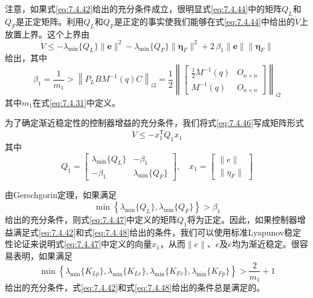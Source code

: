 \documentclass[UTF8]{ctexart}
\begin{document}
注意，如果式\eqref{eq:7.4.42}给出的充分条件成立，很明显式\eqref{eq:7.4.44}中的矩阵$Q_L$和$Q_F$是正定矩阵。利用$Q_L$和$Q_F$是正定的事实使我们能够在式\eqref{eq:7.4.44}中给出的$\dot{V}$上放置上界。这个上界由
\begin{equation}\label{eq:7.4.46}
\dot{V} \leq -\lambda_{\min}\{Q_L\}\|\mathbf{e}\|^2 - \lambda_{\min}\{Q_F\}\|\boldsymbol{\eta}_F\|^2 + 2\, \beta_1 \|\mathbf{e}\| \|\boldsymbol{\eta}_F\|
\end{equation}
给出，其中
\begin{equation*}
\beta_1 = \frac{1}{m_1} > \left\|P_L B M^{-1}(q) C\right\|_{i2} = \frac{1}{2}\left\|\begin{bmatrix} \frac{1}{2}M^{-1}(q) & O_{n \times n} \\ M^{-1}(q) & O_{n \times n} \end{bmatrix}\right\|_{i2}
\end{equation*}
其中$m_1$在式\eqref{eq:7.4.31}中定义。

为了确定渐近稳定性的控制器增益的充分条件，我们将式\eqref{eq:7.4.46}写成矩阵形式
\begin{equation}\label{eq:7.4.47}
\dot{V} \leq -x_1^{\mathsf T} Q_1 x_1
\end{equation}
其中
\begin{equation*}
Q_1 = \begin{bmatrix} \lambda_{\min}\{Q_L\} & -\beta_1 \\ -\beta_1 & \lambda_{\min}\{Q_F\} \end{bmatrix}, \quad x_1 = \begin{bmatrix} \|e\| \\ \|\eta_F\| \end{bmatrix}
\end{equation*}

由Gerschgorin定理，如果满足
\begin{equation}\label{eq:7.4.48}
\min\left\{\lambda_{\min}\{Q_L\},\lambda_{\min}\{Q_F\}\right\} > \beta_1
\end{equation}
给出的充分条件，则式\eqref{eq:7.4.47}中定义的矩阵$Q_1$将为正定。因此，如果控制器增益满足式\eqref{eq:7.4.42}和式\eqref{eq:7.4.48}给出的条件，我们可以使用标准Lyapunov稳定性论证来说明式\eqref{eq:7.4.47}中定义的向量$x_1$，从而$\|e\|$、$e$及$\dot{e}$均为渐近稳定。很容易表明，如果满足
\begin{equation}\label{eq:7.4.49}
\min\left\{\lambda_{\min}\{K_{Lp}\},\lambda_{\min}\{K_{Lv}\},\lambda_{\min}\{K_{Fv}\},\lambda_{\min}\{K_{Fp}\}\right\} > \frac{2}{m_1} + 1
\end{equation}
给出的充分条件，式\eqref{eq:7.4.42}和式\eqref{eq:7.4.48}给出的条件总是满足的。
\end{document}
